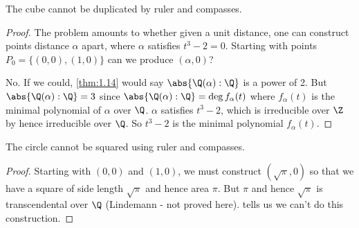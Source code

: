 \documentclass{article}
\begin{document}
\begin{nthm}\label{thm:1.17}
    The cube cannot be duplicated by ruler and compasses.
\end{nthm}
\begin{proof}
    The problem amounts to whether given a unit distance, one can construct points distance $\alpha$ apart, where $\alpha$ satisfies $t^3 - 2 = 0$.
    Starting with points $P_0 = \{(0, 0), (1, 0)\}$ can we produce $(\alpha, 0)$?

    No. If we could, \cref{thm:1.14} would say $\abs{\Q(\alpha):\Q}$ is a power of 2. But $\abs{\Q(\alpha): \Q} = 3$ since $\abs{\Q(\alpha):\Q} = \deg f_\alpha(t)$ where $f_\alpha(t)$ is the minimal polynomial of $\alpha$ over $\Q$. $\alpha$ satisfies $t^3 - 2$, which is irreducible over $\Z$ by  hence irreducible over $\Q$. So $t^3 - 2$ is the minimal polynomial $f_\alpha(t)$.
\end{proof}
\begin{nthm}\label{thm:1.18}
    The circle cannot be squared using ruler and compasses.
\end{nthm}
\begin{proof}
    Starting with $(0, 0)$ and $(1, 0)$, we must construct $(\sqrt{\pi}, 0)$ so that we have a square of side length $\sqrt{\pi}$ and hence area $\pi$.
    But $\pi$ and hence $\sqrt{\pi}$ is transcendental over $\Q$ (Lindemann - not proved here).
     tells us we can't do this construction.
\end{proof}
\end{document}
